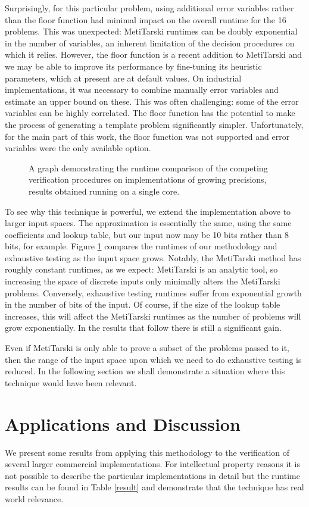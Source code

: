 \documentclass[smallcondensed]{svjour3}
\begin{document}
Surprisingly, for this particular problem, using additional error variables rather than the floor function had minimal impact on the overall runtime for the 16 problems. This was unexpected: MetiTarski runtimes can be doubly exponential in the number of variables, an inherent limitation of the decision procedures on which it relies. However, the floor function is a recent addition to MetiTarski and we may be able to improve its performance by fine-tuning its heuristic parameters, which at present are at default values. On industrial implementations, it was necessary to combine manually error variables and estimate an upper bound on these. This was often challenging: some of the error variables can be highly correlated. The floor function has the potential to make the process of generating a template problem significantly simpler. Unfortunately, for the main part of this work, the floor function was not supported and error variables were the only available option.
\begin{figure}
\centering

\caption{A graph demonstrating the runtime comparison of the competing verification procedures on implementations of growing precisions, results obtained running on a single core. \label{runtime_graph}
}
\end{figure}
To see why this technique is powerful, we extend the implementation above to larger input spaces. The approximation is essentially the same, using the same coefficients and lookup table, but our input now may be 10 bits rather than 8 bits, for example. Figure \ref{runtime_graph} compares the runtimes of our methodology and exhaustive testing as the input space grows. Notably, the MetiTarski method has roughly constant runtimes, as we expect: MetiTarski is an analytic tool, so increasing the space of discrete inputs only minimally alters the MetiTarski problems. Conversely, exhaustive testing runtimes suffer from exponential growth in the number of bits of the input. Of course, if the size of the lookup table increases, this will affect the MetiTarski runtimes as the number of problems will grow exponentially. In the results that follow there is still a significant gain.

Even if MetiTarski is only able to prove a subset of the problems passed to it, then the range of the input space upon which we need to do exhaustive testing is reduced. In the following section we shall demonstrate a situation where this technique would have been relevant. 

\section{Applications and Discussion}
\label{Apps}
We present some results from applying this methodology to the verification of several larger commercial implementations. For intellectual property reasons it is not possible to describe the particular implementations in detail but the runtime results can be found in Table \ref{result} and demonstrate that the technique has real world relevance. 
\end{document}
